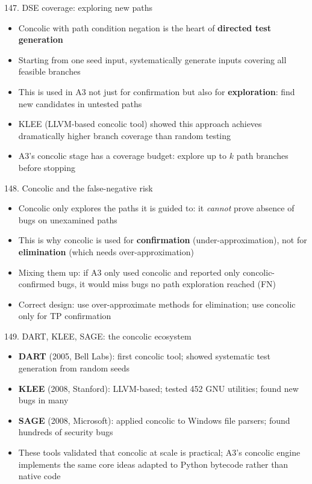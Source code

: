 \documentclass[aspectratio=169]{beamer}
\begin{document}
\begin{frame}{147. DSE coverage: exploring new paths}
\begin{itemize}
  \item Concolic with path condition negation is the heart of \textbf{directed test generation}
  \item Starting from one seed input, systematically generate inputs covering all feasible branches
  \item This is used in A3 not just for confirmation but also for \textbf{exploration}: find new candidates in untested paths
  \item KLEE (LLVM-based concolic tool) showed this approach achieves dramatically higher branch coverage than random testing
  \item A3's concolic stage has a coverage budget: explore up to \(k\) path branches before stopping
\end{itemize}
\end{frame}

\begin{frame}{148. Concolic and the false-negative risk}
\begin{itemize}
  \item Concolic only explores the paths it is guided to: it \emph{cannot} prove absence of bugs on unexamined paths
  \item This is why concolic is used for \textbf{confirmation} (under-approximation), not for \textbf{elimination} (which needs over-approximation)
  \item Mixing them up: if A3 only used concolic and reported only concolic-confirmed bugs, it would miss bugs no path exploration reached (FN)
  \item Correct design: use over-approximate methods for elimination; use concolic only for TP confirmation
\end{itemize}
\end{frame}

\begin{frame}{149. DART, KLEE, SAGE: the concolic ecosystem}
\begin{itemize}
  \item \textbf{DART} (2005, Bell Labs): first concolic tool; showed systematic test generation from random seeds
  \item \textbf{KLEE} (2008, Stanford): LLVM-based; tested 452 GNU utilities; found new bugs in many
  \item \textbf{SAGE} (2008, Microsoft): applied concolic to Windows file parsers; found hundreds of security bugs
  \item These tools validated that concolic at scale is practical; A3's concolic engine implements the same core ideas adapted to Python bytecode rather than native code
\end{itemize}
\end{frame}
\end{document}
